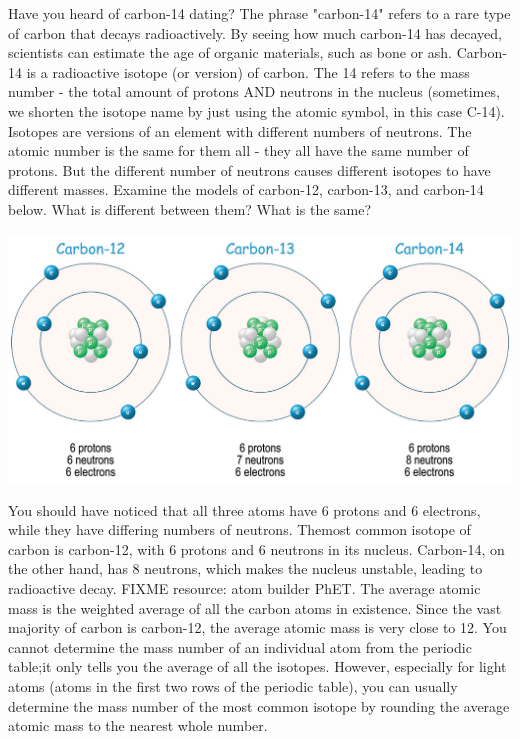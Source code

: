 Have you heard of carbon-14 dating? The phrase "carbon-14" refers to a rare
type of carbon that decays radioactively. By seeing how much carbon-14 has
decayed, scientists can estimate the age of organic materials, such as bone or
ash. Carbon-14 is a radioactive isotope (or version) of carbon. The 14 refers to
the mass number - the total amount of protons AND neutrons in the nucleus 
(sometimes, we shorten the isotope name by just using the atomic symbol, in 
this case C-14). Isotopes are versions of an element with different numbers of 
neutrons. The atomic number is the same for them all - they all have the same 
number of protons. But the different number of neutrons causes different 
isotopes to have different masses. Examine the models of carbon-12, carbon-13, 
and carbon-14 below. What is different between them? What is the same?

\begin{center}
\includegraphics[scale=1]{carbon_iso.png}
\end{center}

You should have noticed that all three atoms have 6 protons and 6 electrons, 
while they have differing numbers of neutrons. Themost common isotope of carbon 
is carbon-12, with 6 protons and 6 neutrons in its nucleus. Carbon-14, on the 
other hand, has 8 neutrons, which makes the nucleus unstable, leading to 
radioactive decay. FIXME resource: atom builder PhET. The average atomic mass 
is the weighted average of all the carbon atoms in existence. Since the vast
majority of carbon is carbon-12, the average atomic mass is very close to 12. 
You cannot determine the mass number of an individual atom from the periodic 
table;it only tells you the average of all the isotopes. However, especially 
for light atoms (atoms in the first two rows of the periodic table), you can 
usually determine the mass number of the most common isotope by rounding the 
average atomic mass to the nearest whole number.

